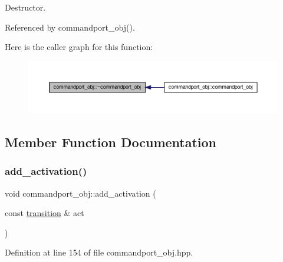Destructor. 



Referenced by commandport\+\_\+obj().

Here is the caller graph for this function\+:
\nopagebreak
\begin{figure}[H]
\begin{center}
\leavevmode
\includegraphics[width=350pt]{d2/d56/classcommandport__obj_a6ac25c311a74ce97e4c703b336ae9981_icgraph}
\end{center}
\end{figure}


\subsection{Member Function Documentation}
\mbox{\label{classcommandport__obj_aa0cb7794affc8302cb3c19e3bf47c70c}} 
\subsubsection{\texorpdfstring{add\+\_\+activation()}{add\_activation()}}
{\footnotesize\ttfamily void commandport\+\_\+obj\+::add\+\_\+activation (\begin{DoxyParamCaption}\item[{const \hyperlink{classcommandport__obj_aae52b929cff6d84d461b91d88baa3203}{transition} \&}]{act }\end{DoxyParamCaption})\hspace{0.3cm}{\ttfamily [inline]}}



Definition at line 154 of file commandport\+\_\+obj.\+hpp.

\mbox{\label{classcommandport__obj_a9e26909bdc9060ccef63a64b9f0bf89e}} 
